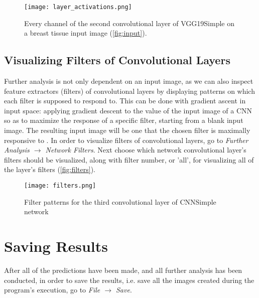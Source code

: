 \begin{figure}[h]
	\centering
	\texttt{[image: layer\_activations.png]}
	\caption{Every channel of the second convolutional layer of VGG19Simple on a breast tissue input image (\textcolor{red}{\autoref{fig:input}}).}
	\label{fig:interact}
\end{figure}

\subsection{Visualizing Filters of Convolutional Layers}

Further analysis is not only dependent on an input image, as we can also inspect feature extractors (filters) of convolutional layers by displaying patterns on which each filter is supposed to respond to. This can be done with gradient ascent in input space: applying gradient descent to the value of the input image of a CNN so as to maximize the response of a specific filter, starting from a blank input image. The resulting input image will be one that the chosen filter is maximally responsive to \cite{chollet2018deep}. In order to visualize filters of convolutional layers, go to \emph{Further Analysis $\rightarrow$ Network Filters}.  Next choose which network convolutional layer's filters should be visualized, along with filter number, or 'all', for visualizing all of the layer's filters  (\textcolor{red}{\autoref{fig:filters}}).

\begin{figure}[h]
	\centering
	\texttt{[image: filters.png]}
	\caption{Filter patterns for the third convolutional layer of CNNSimple network}
	\label{fig:filters}
\end{figure}

\section{Saving Results}
After all of the predictions have been made, and all further analysis has been conducted, in order to save the results, i.e. save all the images created during the program's execution, go to \emph{File $\rightarrow$ Save}.
